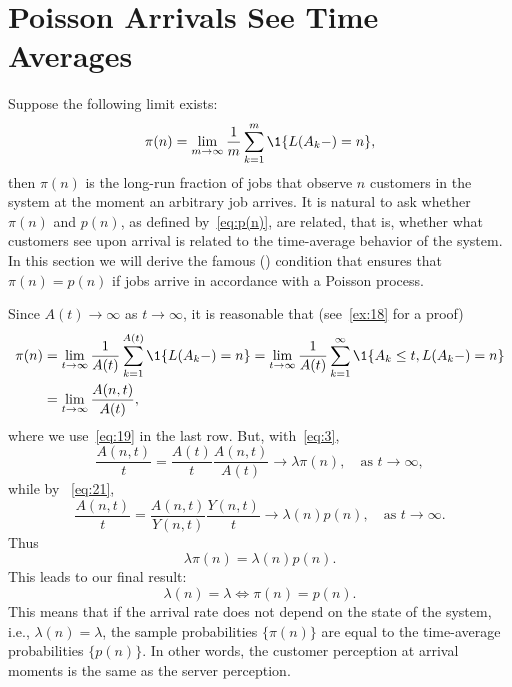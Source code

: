 \section{Poisson Arrivals See Time Averages}
\label{sec:poisson-arrivals-see}



Suppose the following limit exists:
\begin{equation}\label{eq:jaap}
 \pi(n) 
= \lim_{m\to\infty} 
\frac1m\sum_{k=1}^m \1{L(A_k-) = n},
\end{equation}
then $\pi(n)$ is the long-run fraction of jobs that observe $n$ customers in the system at the moment an arbitrary job arrives.
It is natural to ask whether $\pi(n)$ and $p(n)$, as defined by~\cref{eq:p(n)}, are related, that is, whether what customers see upon arrival is related to the time-average behavior of the system.
In this section we will derive the famous  () condition that ensures that $\pi(n)=p(n)$ if jobs arrive in accordance with a Poisson process.


Since $A(t)\to \infty$ as $t\to\infty$, it is reasonable that (see~\cref{ex:18} for a proof)
\begin{equation}\label{eq:132}
 \begin{split}
 \pi(n) &= \lim_{t\to\infty} \frac1{A(t)}\sum_{k=1}^{A(t)} \1{L(A_k-) = n} 
= \lim_{t\to\infty} \frac1{A(t)}\sum_{k=1}^\infty \1{A_k \leq t, L(A_k-) = n} \\
 &= \lim_{t\to\infty} \frac{A(n,t)}{A(t)},
 \end{split}
\end{equation}
where we use~\cref{eq:19} in the last row. But, with~\cref{eq:3}, 
\begin{equation}\label{eq:1333}
 \frac{A(n,t)}{t} 
= \frac{A(t)}t \frac{A(n,t)}{A(t)}
\to \lambda \pi(n), \quad\text{as } t \to \infty, 
\end{equation}
while by ~\cref{eq:21}, 
\begin{equation*}
\frac{A(n,t)}t = \frac{A(n,t)}{Y(n,t)}\frac{Y(n,t)}t \to \lambda(n) p(n), \quad\text{as } t \to \infty.
\end{equation*}
Thus
\begin{equation}\label{eq:13}
\lambda \pi(n) = \lambda(n) p(n).
\end{equation}
This leads to our final result:
\begin{equation*}
 \lambda(n) = \lambda \iff \pi(n) = p(n).
\end{equation*}
This means that if the arrival rate does not depend on the state of the system, i.e., $\lambda(n)=\lambda$, the sample probabilities $\{\pi(n)\}$ are equal to the time-average probabilities $\{p(n)\}$. 
In other words, the customer perception at arrival moments is the same as the server perception.

